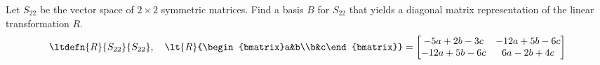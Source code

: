 Let $S_{22}$ be the vector space of $2\times 2$ symmetric matrices. Find a basis $B$ for $S_{22}$ that yields a diagonal matrix representation of the linear transformation $R$.
%
%
\begin{align*}
\ltdefn{R}{S_{22}}{S_{22}},\quad
\lt{R}{\begin{bmatrix}a&b\\b&c\end{bmatrix}}=
\begin{bmatrix}
-5a + 2b - 3c & -12a + 5b - 6c\\ 
-12a + 5b - 6c & 6a - 2b + 4c
\end{bmatrix}
\end{align*}